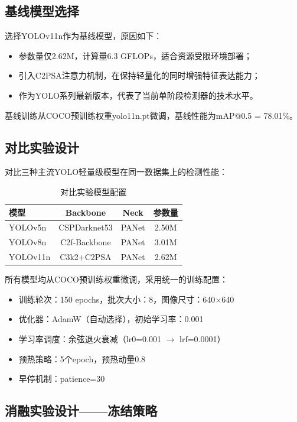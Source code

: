 \documentclass[12pt,a4paper]{article}
\begin{document}
\subsection{基线模型选择}

选择YOLOv11n作为基线模型，原因如下：
\begin{itemize}[noitemsep]
  \item 参数量仅2.62M，计算量6.3 GFLOPs，适合资源受限环境部署；
  \item 引入C2PSA注意力机制，在保持轻量化的同时增强特征表达能力；
  \item 作为YOLO系列最新版本，代表了当前单阶段检测器的技术水平。
\end{itemize}

基线训练从COCO预训练权重yolo11n.pt微调，基线性能为mAP@0.5 = 78.01\%。

\subsection{对比实验设计}

对比三种主流YOLO轻量级模型在同一数据集上的检测性能：

\begin{table}[H]
\centering
\caption{对比实验模型配置}
\begin{tabular}{lccc}
\toprule
模型 & Backbone & Neck & 参数量 \\
\midrule
YOLOv5n & CSPDarknet53 & PANet & 2.50M \\
YOLOv8n & C2f-Backbone & PANet & 3.01M \\
YOLOv11n & C3k2+C2PSA & PANet & 2.62M \\
\bottomrule
\end{tabular}
\end{table}

所有模型均从COCO预训练权重微调，采用统一的训练配置：
\begin{itemize}[noitemsep]
  \item 训练轮次：150 epochs，批次大小：8，图像尺寸：640$\times$640
  \item 优化器：AdamW（自动选择），初始学习率：0.001
  \item 学习率调度：余弦退火衰减（lr0=0.001 $\to$ lrf=0.0001）
  \item 预热策略：5个epoch，预热动量0.8
  \item 早停机制：patience=30
\end{itemize}

\subsection{消融实验设计——冻结策略}
\end{document}
